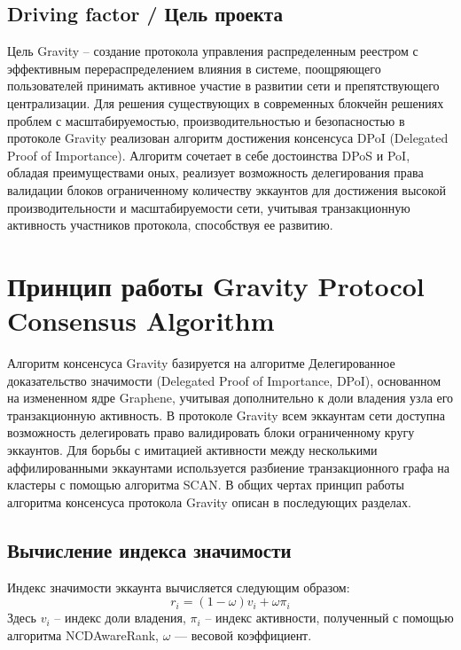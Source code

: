 \documentclass[a4paper,12pt]{article}
\begin{document}
\subsection{Driving factor / Цель проекта}
Цель Gravity – создание протокола управления распределенным реестром с эффективным перераспределением влияния в системе, поощряющего пользователей принимать активное участие в развитии сети и препятствующего централизации. Для решения существующих в современных блокчейн решениях проблем с масштабируемостью, производительностью и безопасностью в протоколе Gravity реализован алгоритм достижения консенсуса DPoI (Delegated Proof of Importance). Алгоритм сочетает в себе достоинства DPoS и PoI, обладая преимуществами оных, реализует возможность делегирования права валидации блоков ограниченному количеству эккаунтов для достижения высокой производительности и масштабируемости сети, учитывая транзакционную активность участников протокола, способствуя ее развитию. 

\section{Принцип работы Gravity Protocol Consensus Algorithm}
Алгоритм консенсуса Gravity базируется на алгоритме Делегированное доказательство значимости (Delegated Proof of Importance, DPoI), основанном на измененном ядре Graphene, учитывая дополнительно к доли владения узла его транзакционную активность. 
В протоколе Gravity всем эккаунтам сети доступна возможность делегировать право валидировать блоки ограниченному кругу эккаунтов.
Для борьбы с имитацией активности между несколькими аффилированными эккаунтами используется разбиение транзакционного графа на кластеры с помощью алгоритма SCAN. В общих чертах принцип работы алгоритма консенсуса протокола Gravity описан в последующих разделах.

\subsection{Вычисление индекса значимости}
Индекс значимости эккаунта вычисляется следующим образом:
$$
r_i = (1 - \omega) v_i + \omega \pi_i
$$
Здесь $v_i$ – индекс доли владения, $\pi_i$ – индекс активности, полученный с помощью алгоритма NCDAwareRank, $\omega$ — весовой коэффициент.
\end{document}
